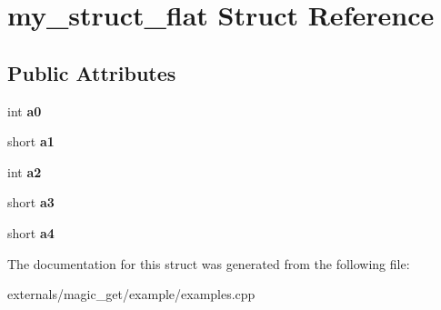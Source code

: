 \hypertarget{structmy__struct__flat}{}\section{my\+\_\+struct\+\_\+flat Struct Reference}
\label{structmy__struct__flat}
\subsection*{Public Attributes}
\begin{DoxyCompactItemize}
\item 
\mbox{\label{structmy__struct__flat_a247016da622da81378ad79789cf218fd}} 
int {\bfseries a0}
\item 
\mbox{\label{structmy__struct__flat_a63cb728e5f528302b2b0f8e1f0c95891}} 
short {\bfseries a1}
\item 
\mbox{\label{structmy__struct__flat_ae1629f14bab5363e0b3873910daedb12}} 
int {\bfseries a2}
\item 
\mbox{\label{structmy__struct__flat_ad78b2b6d222e102d98cfcc94147419f5}} 
short {\bfseries a3}
\item 
\mbox{\label{structmy__struct__flat_a2b233055d0b54bdcc94277e36e5867a7}} 
short {\bfseries a4}
\end{DoxyCompactItemize}


The documentation for this struct was generated from the following file\+:\begin{DoxyCompactItemize}
\item 
externals/magic\+\_\+get/example/examples.\+cpp\end{DoxyCompactItemize}

